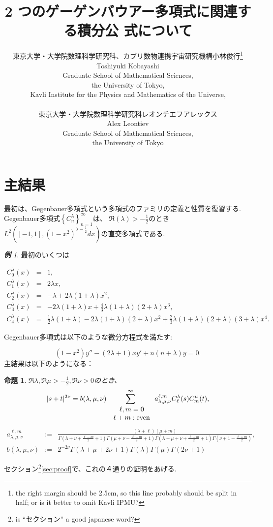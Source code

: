 \documentclass[12pt]{article} %
\title{2 つのゲーゲンバウアー多項式に関連する積分公 式について}
\author{東京大学・大学院数理科学研究科、カブリ数物連携宇宙研究機構\quad 小林\quad 俊行\footnote{
the right margin should be 2.5cm, so this line probably should be split in half; or is it better to omit Kavli IPMU?}\\
Toshiyuki Kobayashi\\
Graduate School of Mathematical Sciences,\\
the University of Tokyo,\\
Kavli Institute for the Physics and Mathematics of the Universe,\\\\
東京大学・大学院数理科学研究科\quad レオンチエフ\quad アレックス\\
Alex Leontiev\\
Graduate School of Mathematical Sciences,\\
the University of Tokyo
}
\date{} %
\newtheorem{prop}{命題}
\theoremstyle{remark}
\newtheorem*{example*}{\textbf{例}}
\newcommand{\tmop}[1]{\ensuremath{\operatorname{#1}}}
\begin{document}
\maketitle

\section{主結果}
	最初は、Gegenbauer多項式という多項式のファミリの定義と性質を復習する.
	Gegenbauer多項式$\left\{ C_n^\lambda \right\}_{n=1}^{\infty}$は、
	$\Re(\lambda)>-\frac{1}{2}$のとき$L^2\left( [-1,1],(1-x^2)^{\lambda-\frac{1}{2}}dx \right)$の直交多項式である.
	
	\begin{example*}
		最初のいくつは
	
		\begin{eqnarray*}
			C_0^\lambda(x)&=&1,\\
			C_1^\lambda(x)&=&2\lambda x,\\
			C_2^\lambda(x)&=&-\lambda+2\lambda(1+\lambda)x^2,\\
			C_3^\lambda(x)&=&-2\lambda(1+\lambda)x+\frac{4}{3}\lambda(1+\lambda)(2+\lambda)x^3,\\
			C_4^\lambda(x)&=&\frac{1}{2}\lambda(1+\lambda)-2\lambda(1+\lambda)(2
			+\lambda)x^2+\frac{2}{3}\lambda(1+\lambda)(2+\lambda)(3+\lambda)x^4.
		\end{eqnarray*}
	\end{example*}
	Gegenbauer多項式は以下のような微分方程式を満たす:
		
	\begin{equation*}
		(1-x^2)y''-(2\lambda+1)xy'+n(n+\lambda)y=0.
	\end{equation*}
	主結果は以下のようになる：
	\begin{prop}\label{prop:exp-st-gg}
		$\Re\lambda,\Re\mu>-\frac{1}{2},\Re\nu>0$のとき、
		\begin{equation}
			| s + t |^{2 \nu} =b(\lambda,\mu,\nu) \sum_{\mbox{ $\begin{array}[]{c}
			\ell, m = 0 \\ \ell + m : \tmop{even}
		\end{array}$}}^{\infty} a_{\lambda,\mu,\nu}^{\ell,m} C_\ell^{\lambda} (s) C_m^{\mu} (t),
			\label{eqn:exp-st-gg}
		\end{equation}
		{
			\begin{equation*}
				\begin{array}{rcl}
	a_{\lambda,\mu,\nu}^{\ell,m}&:=&\frac{ (\lambda + \ell) (\mu + m)}{\Gamma \left( \lambda + \nu + \frac{\ell -
	  m}{2} + 1 \right)  \Gamma \left( \mu + \nu -
	  \frac{\ell - m}{2} + 1 \right)\Gamma \left( \lambda + \mu + \nu + \frac{\ell +
	  m}{2} + 1 \right)\Gamma\left(  \nu+1-\frac{\ell+m}{2}\right)},\\[0.4cm]
	  b(\lambda,\mu,\nu)&:=&2^{-2\nu}\Gamma (\lambda + \mu + 2 \nu + 1){\Gamma (\lambda)
	  \Gamma (\mu)\Gamma \left( 2\nu +
	1 \right)}
			\end{array}
			\end{equation*}
	}
	\end{prop}
	セクション\footnote{is ``セクション'' a good japanese word?}\ref{sec:proof}で、これの４通りの証明をあげる.
\end{document}
